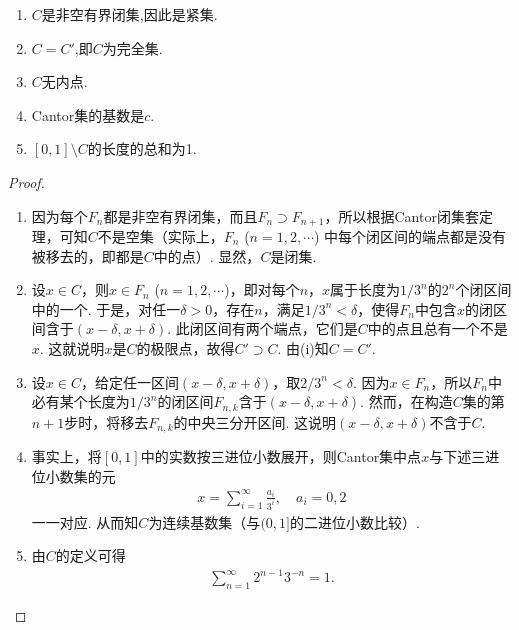 \documentclass[../../main.tex]{subfiles}
\begin{document}
\begin{theorem}[Cantor集的基本性质]\label{theorem:Cantor集的基本性质}
\begin{enumerate}[(1)]
\item $C$是非空有界闭集,因此是紧集.

\item $C = C'$,即$C$为完全集.

\item $C$无内点.

\item Cantor集的基数是$c$.

\item $[0,1]\setminus C$的长度的总和为1.
\end{enumerate}
\end{theorem}
\begin{proof}
\begin{enumerate}[(1)]
\item 因为每个$F_n$都是非空有界闭集，而且$F_n\supset F_{n + 1}$，所以根据Cantor闭集套定理，可知$C$不是空集（实际上，$F_n$ ($n = 1,2,\cdots$) 中每个闭区间的端点都是没有被移去的，即都是$C$中的点）. 显然，$C$是闭集.

\item 设$x\in C$，则$x\in F_n$ ($n = 1,2,\cdots$)，即对每个$n$，$x$属于长度为$1/3^n$的$2^n$个闭区间中的一个. 于是，对任一$\delta>0$，存在$n$，满足$1/3^n<\delta$，使得$F_n$中包含$x$的闭区间含于$(x - \delta, x + \delta)$. 此闭区间有两个端点，它们是$C$中的点且总有一个不是$x$. 这就说明$x$是$C$的极限点，故得$C'\supset C$. 由(i)知$C = C'$.

\item 设$x\in C$，给定任一区间$(x - \delta, x + \delta)$，取$2/3^n<\delta$. 因为$x\in F_n$，所以$F_n$中必有某个长度为$1/3^n$的闭区间$F_{n,k}$含于$(x - \delta, x + \delta)$. 然而，在构造$C$集的第$n + 1$步时，将移去$F_{n,k}$的中央三分开区间. 这说明$(x - \delta, x + \delta)$不含于$C$.

\item 事实上，将$[0,1]$中的实数按三进位小数展开，则Cantor集中点$x$与下述三进位小数集的元
\begin{align*}
x=\sum_{i = 1}^{\infty}\frac{a_i}{3^i}, \quad a_i = 0,2
\end{align*}
一一对应. 从而知$C$为连续基数集（与$(0,1]$的二进位小数比较）. 

\item 由$C$的定义可得
\begin{align*}
\sum_{n = 1}^{\infty}2^{n - 1}3^{-n}=1.
\end{align*}
\end{enumerate}

\end{proof}
\end{document}
